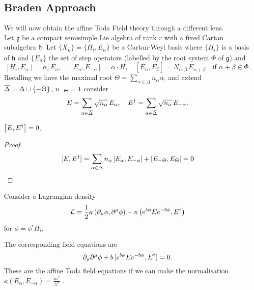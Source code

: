 \documentclass{article}
\begin{document}
\subsection{Braden Approach}
We will now obtain the affine Toda Field theory through a different lens. \\
Let $\mathfrak{g}$ be a compact semisimple Lie algebra of rank $r$ with a fixed Cartan subalgebra $\mathfrak{h}$.
Let $\{X_\mu\}=\{H_i, E_\alpha\}$ be a Cartan-Weyl basis where $\{H_i\}$ is a basis of $\mathfrak{h}$
and $\{E_\alpha\}$ the set of step operators (labelled by the root system $\Phi$ of $\mathfrak{g}$) and 
$$[H_i,E_\alpha]=\alpha_i\, E_\alpha,\quad [E_\alpha,E_{-\alpha}]=\alpha\cdot H,
\quad [E_\alpha, E_\beta]=N_{\alpha,\beta}\, E_{\alpha+\beta} \quad\text{if }\alpha+\beta\in \Phi.
$$
Recalling we have the maximal root $\Theta = \sum_{\alpha \in \Delta} n_\alpha \alpha$, and extend $\bar{\Delta} = \Delta \cup \pbrace{-\Theta}, \, n_{-\Theta} = 1$ consider 
$$E=\sum_{\alpha\in \bar\Delta} \sqrt{n_\alpha}\, E_\alpha,\quad
E\sp\dagger=\sum_{\alpha\in \bar\Delta} \sqrt{n_\alpha}\, E_{-\alpha}.
$$
\begin{lemma}
	$\comm[E]{E^\dagger}=0$.
\end{lemma}
\begin{proof}
$$[E,E\sp\dagger]=\sum_{\alpha\in\Delta}  {n_\alpha}\,[E_\alpha, E_{-\alpha}]+[ E_{-\Theta},E_\Theta]
=0$$
\end{proof}
Consider a Lagrangian density
$$\mathcal{L}=  \frac12 \kappa \left( \partial_\mu\phi, \partial\sp\mu\phi\right) -\kappa \left( e^{b\phi}E  e^{-b\phi}, E\sp\dagger \right)
$$
for $\phi = \phi^i H_i$. 
\begin{prop}
	The corresponding field equations are 
	$$\partial_\mu\partial\sp\mu\phi +b\,[e^{b\phi}E  e^{-b\phi}, E\sp\dagger]=0.$$
	These are the affine Toda field equations if we can make the normalisation $\kappa(E_\alpha,E_{-\alpha}) = \frac{m^2}{\lambda^2}$ . 
\end{prop}
\end{document}
